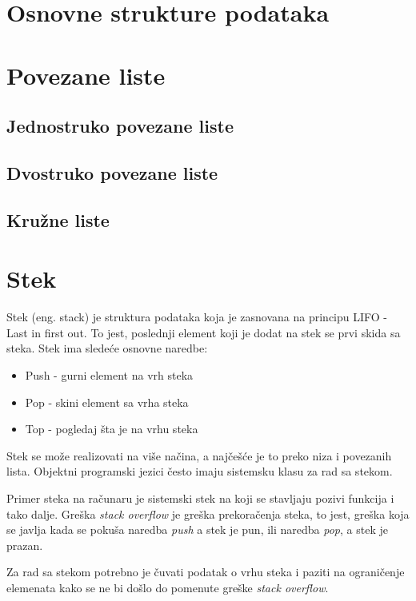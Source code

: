 \documentclass{memoir}
\begin{document}
\section{Osnovne strukture podataka}

\section{Povezane liste}
\subsection{Jednostruko povezane liste}
\subsection{Dvostruko povezane liste}
\subsection{Kružne liste}


\section{Stek}
Stek (eng. stack) je struktura podataka koja je zasnovana na principu LIFO - Last in first out. To jest, poslednji 
element koji je dodat na stek se prvi skida sa steka.
Stek ima sledeće osnovne naredbe:
\begin{itemize}
	\item Push - gurni element na vrh steka
	\item Pop - skini element sa vrha steka
	\item Top - pogledaj šta je na vrhu steka
\end{itemize}

Stek se može realizovati na više načina, a najčešće je to preko niza i povezanih lista. Objektni programski jezici često 
imaju sistemsku klasu za rad sa stekom. 

Primer steka na računaru je sistemski stek na koji se stavljaju pozivi funkcija i tako dalje. Greška \emph{stack overflow} je greška prekoračenja steka, to jest,
	 greška koja se javlja kada se pokuša naredba \emph{push} a stek je pun, ili naredba \emph{pop}, a stek je 
prazan.

Za rad sa stekom potrebno je čuvati podatak o vrhu steka i paziti na ograničenje elemenata kako se ne bi došlo do 
pomenute greške \emph{stack overflow}. 
\end{document}
